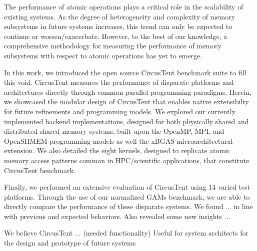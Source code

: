 
The performance of atomic operations plays a critical role in the scalability of existing systems.
As the degree of heterogeneity and complexity of memory subsystems in future systems increases, this trend can only be expected to continue or worsen/exacerbate.
However, to the best of our knowledge, a comprehensive methodology for measuring the performance of memory subsystems with respect to atomic operations has yet to emerge.

In this work, we introduced the open source CircusTent benchmark suite to fill this void.
CircusTent measures the performance of disparate platforms and architectures directly through common parallel programming paradigms.
Herein, we showcased the modular design of CircusTent that enables native extensibilty for future refinements and programming models.
We explored our currently implemented backend implementations, designed for both physically shared and distributed shared memory systems, built upon the OpenMP, MPI, and OpenSHMEM programming models as well the xBGAS microarchitectural extension.
We also detailed the eight kernels, designed to replicate atomic memory access patterns common in HPC/scientific applications, that constitute CircusTent benchmark.

Finally, we performed an extensive evaluation of CircusTent using 14 varied test platforms.
Through the use of our normalized GAMs benchmark, we are able to directly compare the performance of these disparate systems.
We found ...  in line with previous and expected behaviors.
Also revealed some new insights ...

We believe CircusTent ... (needed functionality) 
Useful for system architects for the design and prototype of future systems


